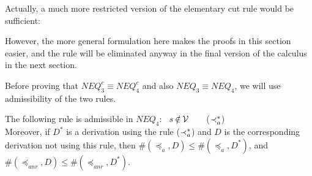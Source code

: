 \begin{REMARK}\label{re:cutx}
Actually, a much more restricted
version of the elementary cut rule would be sufficient: 
\begin{center}  \end{center}
However, the more general formulation here makes
the proofs in this section easier, and the rule will be eliminated anyway in the
final version of the calculus in the next section.
\end{REMARK}
\noindent
Before proving that $NEQ_3^c \equiv NEQ_4^c$ and also $NEQ_3\equiv
NEQ_4$, we will use admissibility of the two rules.
%
\begin{LEMMA}\label{le:inclaad} The following rule is admissible in $NEQ_4$:
\ $s\not\in\Vars$\ \ \ \ ($\mathbin{\prec}_a^*$) \\
Moreover, if $D^*$ is a derivation using the rule ($\mathbin{\prec}_a^*$) and $D$ is the corresponding
derivation not using this rule, then $\#(\preceq_a,D)\leq\#(\preceq_a,D^*)$, and
$\#(\preceq_{anr},D)\leq\#(\preceq_{anr},D^*)$. \\ 
\end{LEMMA}
